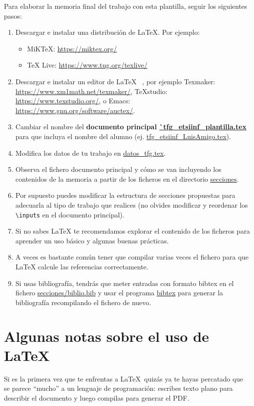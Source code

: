 Para elaborar la memoria final del trabajo con esta plantilla, seguir los siguientes pasos:
\begin{enumerate}
\item Descargar e instalar una distribución de \LaTeX. Por ejemplo:
  \begin{itemize}
  \item MiKTeX:  \url{https://miktex.org/}
  \item TeX Live: \url{https://www.tug.org/texlive/}
  \end{itemize}
\item Descargar e instalar un editor de \LaTeX~ , por ejemplo
  Texmaker: \url{https://www.xm1math.net/texmaker/}, TeXstudio:
  \url{https://www.texstudio.org/}, o Emacs:
  \url{https://www.gnu.org/software/auctex/}.
\item Cambiar el nombre del \textbf{documento principal
    \url{`tfg_etsiinf_plantilla.tex}} para que incluya el nombre del
  alumno (ej. \url{tfg_etsiinf_LuisAmigo.tex}).
\item Modifica los datos de tu trabajo en \url{datos_tfg.tex}.
\item Observa el fichero documento principal y cómo se van incluyendo
  los contenidos de la memoria a partir de los ficheros en el
  directorio \url{secciones}.
\item Por supuesto puedes modificar la estructura de secciones
  propuestas para adecuarla al tipo de trabajo que realices (no
  olvides modificar y reordenar los \verb|\inputs| en el documento
  principal).
\item Si no sabes LaTeX te recomendamos explorar el contenido de los
  ficheros para aprender un uso básico y algunas buenas prácticas.
\item A veces es bastante común tener que compilar varias veces el
  fichero para que LaTeX calcule las referencias correctamente.
\item Si usas bibliografía, tendrás que meter entradas con formato
  bibtex en el fichero \url{secciones/biblio.bib} y usar el programa
  \url{bibtex} para generar la bibliografía recompilando el fichero de
  nuevo.
\end{enumerate}

\section{Algunas notas sobre el uso de \LaTeX}
\label{sec:latex}

Si es la primera vez que te enfrentas a \LaTeX\ quizás ya te hayas
percatado que se parece ``mucho'' a un lenguaje de programación:
escribes texto plano para describir el documento y luego compilas para
generar el PDF.

